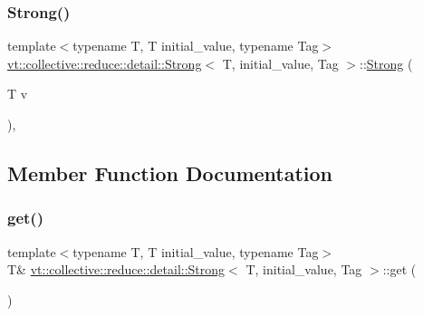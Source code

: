 \subsubsection{\texorpdfstring{Strong()}{Strong()}\hspace{0.1cm}{\footnotesize\ttfamily [2/2]}}
{\footnotesize\ttfamily template$<$typename T, T initial\+\_\+value, typename Tag$>$ \\
\hyperlink{structvt_1_1collective_1_1reduce_1_1detail_1_1_strong}{vt\+::collective\+::reduce\+::detail\+::\+Strong}$<$ T, initial\+\_\+value, Tag $>$\+::\hyperlink{structvt_1_1collective_1_1reduce_1_1detail_1_1_strong}{Strong} (\begin{DoxyParamCaption}\item[{T}]{v }\end{DoxyParamCaption})\hspace{0.3cm}{\ttfamily [inline]}, {\ttfamily [explicit]}}



\subsection{Member Function Documentation}
\mbox{\label{structvt_1_1collective_1_1reduce_1_1detail_1_1_strong_a410692a65741df1c5e3a5498f22717c6}} 
\subsubsection{\texorpdfstring{get()}{get()}\hspace{0.1cm}{\footnotesize\ttfamily [1/2]}}
{\footnotesize\ttfamily template$<$typename T, T initial\+\_\+value, typename Tag$>$ \\
T\& \hyperlink{structvt_1_1collective_1_1reduce_1_1detail_1_1_strong}{vt\+::collective\+::reduce\+::detail\+::\+Strong}$<$ T, initial\+\_\+value, Tag $>$\+::get (\begin{DoxyParamCaption}{ }\end{DoxyParamCaption})\hspace{0.3cm}{\ttfamily [inline]}}

\mbox{\label{structvt_1_1collective_1_1reduce_1_1detail_1_1_strong_a329a5157d759c1c413380b495d23c79f}} 
